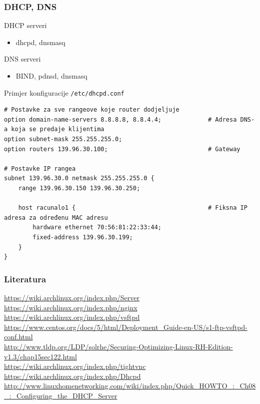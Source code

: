 \documentclass[t,table,usenames,dvipsnames]{beamer}
\begin{document}
\begin{frame}[fragile]

\frametitle{DHCP, DNS}

DHCP serveri
\begin{itemize}
	\item dhcpd, dnsmasq
\end{itemize}

DNS serveri
\begin{itemize}
	\item BIND, pdnsd, dnsmasq
\end{itemize}

\vfill

Primjer konfiguracije \texttt{/etc/dhcpd.conf}	
	\tiny
	\begin{verbatim}
# Postavke za sve rangeove koje router dodjeljuje
option domain-name-servers 8.8.8.8, 8.8.4.4;             # Adresa DNS-a koja se predaje klijentima
option subnet-mask 255.255.255.0;
option routers 139.96.30.100;                            # Gateway

# Postavke IP rangea
subnet 139.96.30.0 netmask 255.255.255.0 {
    range 139.96.30.150 139.96.30.250;
	
    host racunalo1 {                                     # Fiksna IP adresa za određenu MAC adresu
        hardware ethernet 70:56:81:22:33:44;
        fixed-address 139.96.30.199;
    }
}
	\end{verbatim}

\end{frame}



\begin{frame}
	\frametitle{Literatura}
	\url{https://wiki.archlinux.org/index.php/Server}
	\vfill
	\url{https://wiki.archlinux.org/index.php/nginx}
	\url{https://wiki.archlinux.org/index.php/vsftpd}\\
	\url{https://www.centos.org/docs/5/html/Deployment_Guide-en-US/s1-ftp-vsftpd-conf.html}\\
	\vfill
	\url{http://www.tldp.org/LDP/solrhe/Securing-Optimizing-Linux-RH-Edition-v1.3/chap15sec122.html}\\
	\vfill
	\url{https://wiki.archlinux.org/index.php/tightvnc}\\
	\vfill
	\url{https://wiki.archlinux.org/index.php/Dhcpd}\\
	\url{http://www.linuxhomenetworking.com/wiki/index.php/Quick_HOWTO_:_Ch08_:_Configuring_the_DHCP_Server}
\end{frame}
\end{document}
